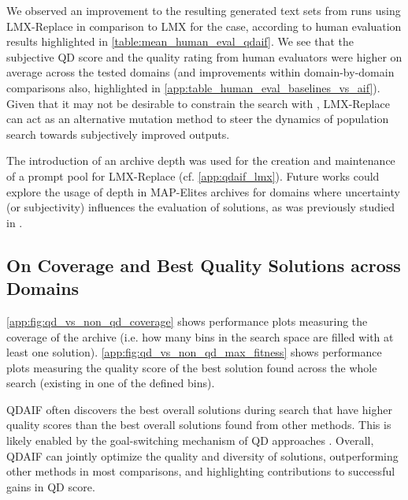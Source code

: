 We observed an improvement to the resulting generated text sets from runs using LMX-Replace in comparison to LMX for the \qdaifinitzero{} case, according to human evaluation results highlighted in \cref{table:mean_human_eval_qdaif}. We see that the subjective QD score and the quality rating from human evaluators were higher on average across the tested domains (and improvements within domain-by-domain comparisons also, highlighted in \cref{app:table_human_eval_baselines_vs_aif}). Given that it may not be desirable to constrain the search with \qdaifnearseed, LMX-Replace can act as an alternative mutation method to steer the dynamics of population search towards subjectively improved outputs.

The introduction of an archive depth was used for the creation and maintenance of a prompt pool for LMX-Replace (cf. \cref{app:qdaif_lmx}). Future works could explore the usage of depth in MAP-Elites archives for domains where uncertainty (or subjectivity) influences the evaluation of solutions, as was previously studied in \citet{flageat2020fast,flageat2023uncertain}.

\clearpage
\newpage
\subsection{On Coverage and Best Quality Solutions across Domains}\label{app:coverage_best_solution_discussion}
\cref{app:fig:qd_vs_non_qd_coverage} shows performance plots measuring the coverage of the archive (i.e. how many bins in the search space are filled with at least one solution). \cref{app:fig:qd_vs_non_qd_max_fitness} shows performance plots measuring the quality score of the best solution found across the whole search (existing in one of the defined bins).

QDAIF often discovers the best overall solutions during search that have higher quality scores than the best overall solutions found from other methods. This is likely enabled by the goal-switching mechanism of QD approaches \citep{mouret2015illuminating,gaier2019quality}. Overall, QDAIF can jointly optimize the quality and diversity of solutions, outperforming other methods in most comparisons, and highlighting contributions to successful gains in QD score.

